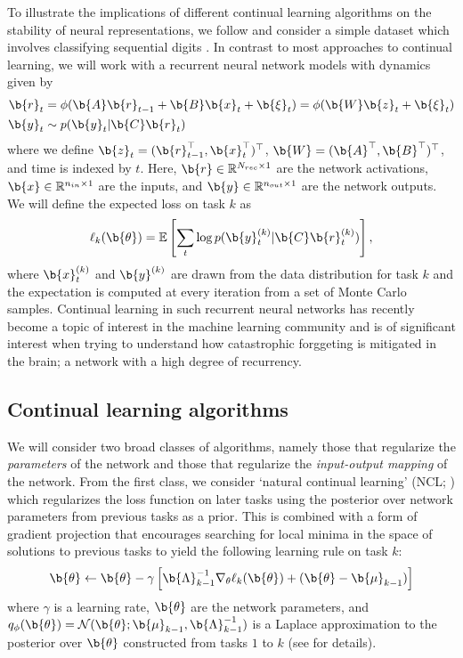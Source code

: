 To illustrate the implications of different continual learning algorithms on the stability of neural representations, we follow \citet{kao2021natural} and consider a simple dataset which involves classifying sequential digits \citep{de2016incremental}.
In contrast to most approaches to continual learning, we will work with a recurrent neural network models with dynamics given by 
\begin{align}
	\label{eq:dynamics}
	\b{r}_t & = \phi(\b{A} \b{r}_{t-1} +  \b{B}\b{x}_t 
	+ \b{\xi}_t) = \phi(\b{W} \b{z}_t + \b{\xi}_t)       \\
	\b{y}_t & \sim p(\b{y}_t | \b{C} \b{r}_t)     
\end{align}
%
where we define $\b{z}_t = (\b{r}_{t-1}^\top, \b{x}_t^\top)^\top$, $\b{W} = (\b{A}^\top, \b{B}^\top)^\top$, and time is indexed by $t$.
Here, $\b{r} \in \mathbb{R}^{N_{rec} \times 1}$ are the network activations, $\b{x} \in \mathbb{R}^{n_{in} \times 1}$ are the inputs, and $\b{y} \in \mathbb{R}^{n_{out} \times 1}$ are the network outputs.
We will define the expected loss on task $k$ as
\begin{equation}
    \ell_k(\b{\theta}) = \mathbb{E} \left [ \sum_t \log p(\b{y}^{(k)}_t | \b{C} \b{r}^{(k)}_t) \right ],
\end{equation}
where $\b{x}^{(k)}_t$ and $\b{y}^{(k)}$ are drawn from the data distribution for task $k$ and the expectation is computed at every iteration from a set of Monte Carlo samples.
Continual learning in such recurrent neural networks has recently become a topic of interest in the machine learning community \citep{ehret2020continual, duncker2020organizing} and is of significant interest when trying to understand how catastrophic forggeting is mitigated in the brain; a network with a high degree of recurrency.

\subsection*{Continual learning algorithms}

We will consider two broad classes of algorithms, namely those that regularize the \emph{parameters} of the network and those that regularize the \emph{input-output mapping} of the network.
From the first class, we consider `natural continual learning' (NCL; \citealp{kao2021natural}) which regularizes the loss function on later tasks using the posterior over network parameters from previous tasks as a prior.
This is combined with a form of gradient projection that encourages searching for local minima in the space of solutions to previous tasks to yield the following learning rule on task $k$:
\begin{equation}
    \label{eq:ncl}
    \b{\theta} \leftarrow \b{\theta} - \gamma \left [ \b{\Lambda}_{k-1}^{-1} \nabla_\theta \ell_k(\b{\theta}) + (\b{\theta} - \b{\mu}_{k-1}) \right ]
\end{equation}
where $\gamma$ is a learning rate, $\b{\theta}$ are the network parameters, and $q_\phi(\b{\theta}) = \mathcal{N}(\b{\theta}; \b{\mu}_{k-1}, \b{\Lambda}_{k-1}^{-1})$ is a Laplace approximation to the posterior over $\b{\theta}$ constructed from tasks $1$ to $k$ (see \citealp{kao2021natural} for details).

